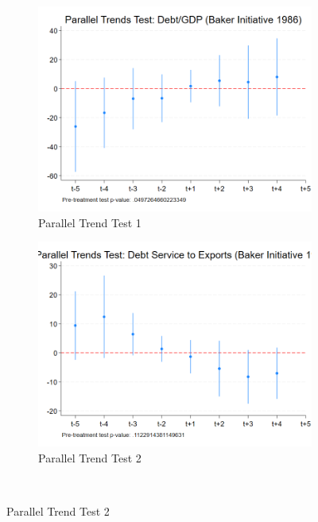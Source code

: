 \begin{figure}[ht!]
    \centering
    \begin{subfigure}[b]{0.48\textwidth}
        \centering
        \includegraphics[width=\textwidth]{figures/PT_Baker_Debt.png}
        \caption{Parallel Trend Test 1}
        \label{fig:pt1_eme}
    \end{subfigure}
    \hfill
    \begin{subfigure}[b]{0.48\textwidth}
        \centering
        \includegraphics[width=\textwidth]{figures/PT_Baker_DebtServ.png}
        \caption{Parallel Trend Test 2}
        \label{fig:pt2_eme}
    \end{subfigure}
    \\[1em]

\end{figure}

